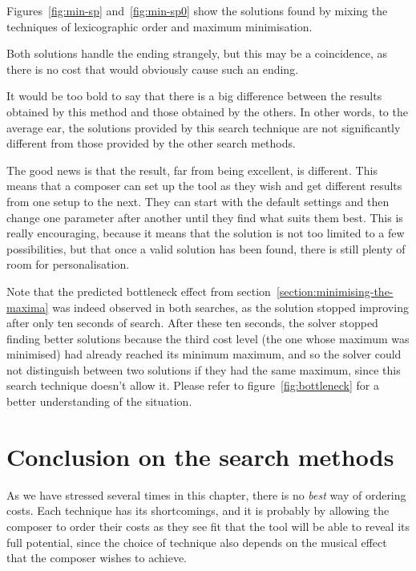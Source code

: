 Figures~\ref{fig:min-sp} and~\ref{fig:min-sp0} show the solutions found by mixing the techniques of lexicographic order and maximum minimisation.

Both solutions handle the ending strangely, but this may be a coincidence, as there is no cost that would obviously cause such an ending.

It would be too bold to say that there is a big difference between the results obtained by this method and those obtained by the others. In other words, to the average ear, the solutions provided by this search technique are not significantly different from those provided by the other search methods.


The good news is that the result, far from being excellent, is different. This means that a composer can set up the tool as they wish and get different results from one setup to the next. They can start with the default settings and then change one parameter after another until they find what suits them best. This is really encouraging, because it means that the solution is not too limited to a few possibilities, but that once a valid solution has been found, there is still plenty of room for personalisation.


Note that the predicted bottleneck effect from section~\ref{section:minimising-the-maxima} was indeed observed in both searches, as the solution stopped improving after only ten seconds of search. After these ten seconds, the solver stopped finding better solutions because the third cost level (the one whose maximum was minimised) had already reached its minimum maximum, and so the solver could not distinguish between two solutions if they had the same maximum, since this search technique doesn't allow it. Please refer to figure~\ref{fig:bottleneck} for a better understanding of the situation.


\section{Conclusion on the search methods}
As we have stressed several times in this chapter, there is no \textit{best} way of ordering costs. Each technique has its shortcomings, and it is probably by allowing the composer to order their costs as they see fit that the tool will be able to reveal its full potential, since the choice of technique also depends on the musical effect that the composer wishes to achieve.


